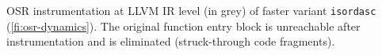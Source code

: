 \label{fig:isordascto} OSR instrumentation at LLVM IR level (in grey) of faster variant {\tt isordasc} (\myfigure\ref{fi:osr-dynamics}). The original function entry block is unreachable after instrumentation and is eliminated (struck-through code fragments).